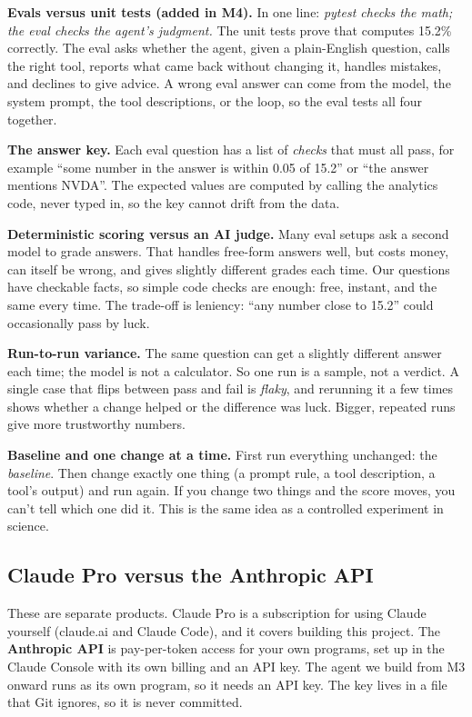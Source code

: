 \documentclass[11pt]{article}
\newcommand{\code}[1]{\texttt{\detokenize{#1}}}
\begin{document}
\textbf{Evals versus unit tests (added in M4).} In one line: \emph{pytest checks the math; the
eval checks the agent's judgment.} The unit tests prove that \code{analytics.py} computes
15.2\% correctly. The eval asks whether the agent, given a plain-English question, calls the
right tool, reports what came back without changing it, handles mistakes, and declines to give
advice. A wrong eval answer can come from the model, the system prompt, the tool descriptions,
or the loop, so the eval tests all four together.

\textbf{The answer key.} Each eval question has a list of \emph{checks} that must all pass,
for example ``some number in the answer is within 0.05 of 15.2'' or ``the answer mentions
NVDA''. The expected values are computed by calling the analytics code, never typed in, so
the key cannot drift from the data.

\textbf{Deterministic scoring versus an AI judge.} Many eval setups ask a second model to
grade answers. That handles free-form answers well, but costs money, can itself be wrong, and
gives slightly different grades each time. Our questions have checkable facts, so simple
code checks are enough: free, instant, and the same every time. The trade-off is leniency:
``any number close to 15.2'' could occasionally pass by luck.

\textbf{Run-to-run variance.} The same question can get a slightly different answer each
time; the model is not a calculator. So one run is a sample, not a verdict. A single case that
flips between pass and fail is \emph{flaky}, and rerunning it a few times shows whether a
change helped or the difference was luck. Bigger, repeated runs give more trustworthy numbers.

\textbf{Baseline and one change at a time.} First run everything unchanged: the
\emph{baseline}. Then change exactly one thing (a prompt rule, a tool description, a tool's
output) and run again. If you change two things and the score moves, you can't tell which one
did it. This is the same idea as a controlled experiment in science.

\subsection{Claude Pro versus the Anthropic API}

These are separate products. Claude Pro is a subscription for using Claude yourself (claude.ai
and Claude Code), and it covers building this project. The \textbf{Anthropic API} is
pay-per-token access for your own programs, set up in the Claude Console with its own billing
and an API key. The agent we build from M3 onward runs as its own program, so it needs an API
key. The key lives in a \code{.env} file that Git ignores, so it is never committed.
\end{document}

